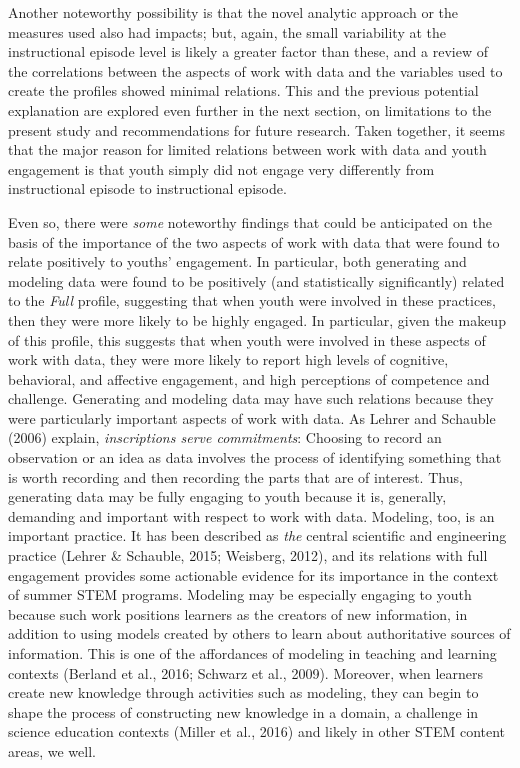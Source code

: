 \documentclass[]{msu-thesis}
\theoremstyle{definition}
\theoremstyle{definition}
\theoremstyle{definition}
\theoremstyle{remark}
\begin{document}
Another noteworthy possibility is that the novel analytic approach or
the measures used also had impacts; but, again, the small variability at
the instructional episode level is likely a greater factor than these,
and a review of the correlations between the aspects of work with data
and the variables used to create the profiles showed minimal relations.
This and the previous potential explanation are explored even further in
the next section, on limitations to the present study and
recommendations for future research. Taken together, it seems that the
major reason for limited relations between work with data and youth
engagement is that youth simply did not engage very differently from
instructional episode to instructional episode.

Even so, there were \emph{some} noteworthy findings that could be
anticipated on the basis of the importance of the two aspects of work
with data that were found to relate positively to youths' engagement. In
particular, both generating and modeling data were found to be
positively (and statistically significantly) related to the \emph{Full}
profile, suggesting that when youth were involved in these practices,
then they were more likely to be highly engaged. In particular, given
the makeup of this profile, this suggests that when youth were involved
in these aspects of work with data, they were more likely to report high
levels of cognitive, behavioral, and affective engagement, and high
perceptions of competence and challenge. Generating and modeling data
may have such relations because they were particularly important aspects
of work with data. As Lehrer and Schauble (2006) explain,
\emph{inscriptions serve commitments}: Choosing to record an observation
or an idea as data involves the process of identifying something that is
worth recording and then recording the parts that are of interest. Thus,
generating data may be fully engaging to youth because it is, generally,
demanding and important with respect to work with data. Modeling, too,
is an important practice. It has been described as \emph{the} central
scientific and engineering practice (Lehrer \& Schauble, 2015; Weisberg,
2012), and its relations with full engagement provides some actionable
evidence for its importance in the context of summer STEM programs.
Modeling may be especially engaging to youth because such work positions
learners as the creators of new information, in addition to using models
created by others to learn about authoritative sources of information.
This is one of the affordances of modeling in teaching and learning
contexts (Berland et al., 2016; Schwarz et al., 2009). Moreover, when
learners create new knowledge through activities such as modeling, they
can begin to shape the process of constructing new knowledge in a
domain, a challenge in science education contexts (Miller et al., 2016)
and likely in other STEM content areas, we well.
\end{document}
